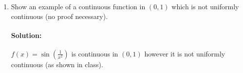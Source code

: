 \documentclass{article}
\begin{document}
\begin{enumerate}
\begin{enumerate}
\begin{proof}
                We now have guaranteed that $|f(x)-f(y)|=1$ for any $k$. 
                It aids us to note that thanks to our choice of $k$, we can say that 
                $\frac{1}{k}<\delta^2$ and $\frac{1}{\sqrt{k} }<\delta$. So then we proceed
                on $|y-x|$.

                \begin{align*}
                    |y-x|&=y-x&\text{Since }y>x\\
                    &= \sqrt{\pi k} -\sqrt{\pi k-\frac{\pi}{2}}  \\
                    &= \frac{\left(\sqrt{\pi k} -\sqrt{\pi k-\frac{\pi}{2}}\right)
                    \left(\sqrt{\pi k} +\sqrt{\pi k-\frac{\pi}{2}}\right)  }
                    {\left(\sqrt{\pi k} +\sqrt{\pi k-\frac{\pi}{2}}\right) } \\
                    &= \frac{\pi k -\left({\pi k-\frac{\pi}{2}}\right)}
                    {\left(\sqrt{\pi k} +\sqrt{ \pi k-\frac{\pi}{2}}\right) } \\
                    &= \frac{\frac{\pi}{2}} {\left(\sqrt{\pi k} +\sqrt{ \pi k-\frac{\pi}{2}}\right) } \\
                    &= \frac{\pi} {2\left(\sqrt{\pi k} +\sqrt{ \pi k-\frac{\pi}{2}}\right) } \\
                    &= \frac{\pi} {2\sqrt{\pi} \left(\sqrt{k} +\sqrt{  k-\frac{1}{2}}\right) } \\
                    &< \frac{\sqrt{ \pi}} {2\left(\sqrt{k} +\sqrt{  k}\right) } \\
                    &<\frac{\sqrt{\pi} }{4\sqrt{k} }&\text{Since }\frac{\sqrt{\pi} }{4}<1 \\
                    &< \frac{1}{\sqrt{k}}\\
                    &<\delta
                .\end{align*}
            \end{proof}

        \item Show an example of a continuous function in $(0,1)$ which is not uniformly
            continuous (no proof necessary).

            \paragraph{Solution:} $f(x)=\sin\left( \frac{1}{x^2} \right) $ is continuous in $(0,1)$ however
            it is not uniformly continuous (as shown in class).
    \end{enumerate}

\end{enumerate}
\end{document}
